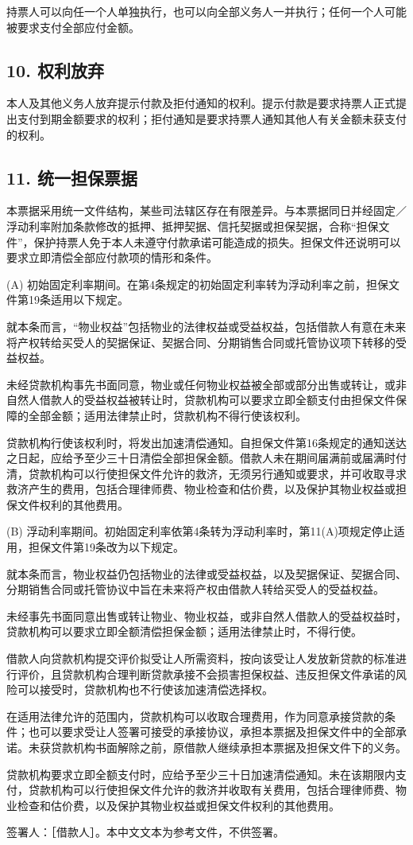 \documentclass[UTF8,fontset=none,11pt,a4paper]{ctexart}
\begin{document}
持票人可以向任一个人单独执行，也可以向全部义务人一并执行；任何一个人可能被要求支付全部应付金额。


\subsection*{10. 权利放弃}
本人及其他义务人放弃提示付款及拒付通知的权利。提示付款是要求持票人正式提出支付到期金额要求的权利；拒付通知是要求持票人通知其他人有关金额未获支付的权利。


\subsection*{11. 统一担保票据}
本票据采用统一文件结构，某些司法辖区存在有限差异。与本票据同日并经固定／浮动利率附加条款修改的抵押、抵押契据、信托契据或担保契据，合称“担保文件”，保护持票人免于本人未遵守付款承诺可能造成的损失。担保文件还说明可以要求立即清偿全部应付款项的情形和条件。


(A) 初始固定利率期间。在第4条规定的初始固定利率转为浮动利率之前，担保文件第19条适用以下规定。


就本条而言，“物业权益”包括物业的法律权益或受益权益，包括借款人有意在未来将产权转给买受人的契据保证、契据合同、分期销售合同或托管协议项下转移的受益权益。


未经贷款机构事先书面同意，物业或任何物业权益被全部或部分出售或转让，或非自然人借款人的受益权益被转让时，贷款机构可以要求立即全额支付由担保文件保障的全部金额；适用法律禁止时，贷款机构不得行使该权利。


贷款机构行使该权利时，将发出加速清偿通知。自担保文件第16条规定的通知送达之日起，应给予至少三十日清偿全部担保金额。借款人未在期间届满前或届满时付清，贷款机构可以行使担保文件允许的救济，无须另行通知或要求，并可收取寻求救济产生的费用，包括合理律师费、物业检查和估价费，以及保护其物业权益或担保文件权利的其他费用。


(B) 浮动利率期间。初始固定利率依第4条转为浮动利率时，第11(A)项规定停止适用，担保文件第19条改为以下规定。


就本条而言，物业权益仍包括物业的法律或受益权益，以及契据保证、契据合同、分期销售合同或托管协议中旨在未来将产权由借款人转给买受人的受益权益。


未经事先书面同意出售或转让物业、物业权益，或非自然人借款人的受益权益时，贷款机构可以要求立即全额清偿担保金额；适用法律禁止时，不得行使。


借款人向贷款机构提交评价拟受让人所需资料，按向该受让人发放新贷款的标准进行评价，且贷款机构合理判断贷款承接不会损害担保权益、违反担保文件承诺的风险可以接受时，贷款机构也不行使该加速清偿选择权。


在适用法律允许的范围内，贷款机构可以收取合理费用，作为同意承接贷款的条件；也可以要求受让人签署可接受的承接协议，承担本票据及担保文件中的全部承诺。未获贷款机构书面解除之前，原借款人继续承担本票据及担保文件下的义务。


贷款机构要求立即全额支付时，应给予至少三十日加速清偿通知。未在该期限内支付，贷款机构可以行使担保文件允许的救济并收取有关费用，包括合理律师费、物业检查和估价费，以及保护其物业权益或担保文件权利的其他费用。


签署人：［借款人］。本中文文本为参考文件，不供签署。
\end{document}
